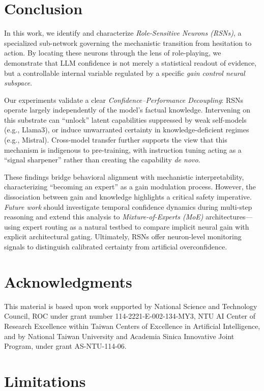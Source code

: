 \documentclass{article}
\begin{document}
\section{Conclusion}
\label{sec:conclusion}
In this work, we identify and characterize \emph{Role-Sensitive Neurons (RSNs)}, a specialized sub-network governing the mechanistic transition from hesitation to action. By locating these neurons through the lens of role-playing, we demonstrate that LLM confidence is not merely a statistical readout of evidence, but a controllable internal variable regulated by a specific \emph{gain control neural subspace}.

Our experiments validate a clear \emph{Confidence--Performance Decoupling}: RSNs operate largely independently of the model’s factual knowledge. Intervening on this substrate can ``unlock'' latent capabilities suppressed by weak self-models (e.g., Llama3), or induce unwarranted certainty in knowledge-deficient regimes (e.g., Mistral). Cross-model transfer further supports the view that this mechanism is indigenous to pre-training, with instruction tuning acting as a ``signal sharpener'' rather than creating the capability \emph{de novo}.

These findings bridge behavioral alignment with mechanistic interpretability, characterizing ``becoming an expert'' as a gain modulation process. However, the dissociation between gain and knowledge highlights a critical safety imperative. \emph{Future work} should investigate temporal confidence dynamics during multi-step reasoning and extend this analysis to \emph{Mixture-of-Experts (MoE)} architectures—using expert routing as a natural testbed to compare implicit neural gain with explicit architectural gating. Ultimately, RSNs offer neuron-level monitoring signals to distinguish calibrated certainty from artificial overconfidence.

\section*{Acknowledgments}
This material is based upon work supported by National Science and Technology Council, ROC under grant number 114-2221-E-002-134-MY3, NTU AI Center of Research Excellence within Taiwan Centers of Excellence in Artificial Intelligence, and by National Taiwan University and Academia Sinica Innovative Joint Program, under grant AS-NTU-114-06.

\clearpage
\section*{Limitations}
\label{sec:limitations}
\end{document}

